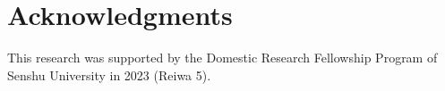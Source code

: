 \section{Acknowledgments}\label{acknowledgments}

This research was supported by the Domestic Research Fellowship Program of Senshu University in 2023 (Reiwa 5).



\address{%
Koji Kosugi\\
Senshu University\\%
School of Human Sciences\\ 2-1-1, Higashi-mita, Tama-ku, Kanagawa Pref, Japan\\
%
\url{https://kosugitti.github.io/kosugitti10/}\\%
\textit{ORCiD: \href{https://orcid.org/0000-0001-5816-0099}{0000-0001-5816-0099}}\\%
\href{mailto:kosugi@psy.senshu-u.ac.jp}{\nolinkurl{kosugi@psy.senshu-u.ac.jp}}%
}

\address{%
Kojiro Shojima\\
The National Center for University Entrance Examinations\\%
Research Division\\ 2-19-23, Komaba, Meguro-ku, Tokyo, Japan\\
%
\url{http://sh0j1ma.stars.ne.jp/tde/index.htm}\\%
%
\href{mailto:shojima@rd.dnc.ac.jp}{\nolinkurl{shojima@rd.dnc.ac.jp}}%
}
